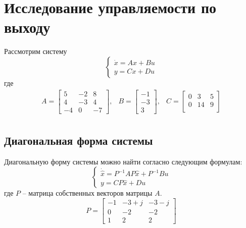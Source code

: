 \section{Исследование управляемости по выходу}
Рассмотрим систему 
\begin{equation}
    \begin{cases}
        \dot{x} = Ax + Bu \\
        y = Cx + Du 
    \end{cases}
\end{equation}
где 
\begin{equation}
    \begin{array}{ccc}
        A = \begin{bmatrix}
            5 & -2 & 8 \\
            4 & -3 & 4 \\
            -4 & 0 & -7
        \end{bmatrix}, &
        B = \begin{bmatrix}
            -1 \\
            -3 \\
            3
        \end{bmatrix}, &
        C = \begin{bmatrix}
            0 & 3 & 5  \\ 
            0 & 14 & 9 \\
        \end{bmatrix} \\
    \end{array}
\end{equation}


\subsection{Диагональная форма системы}
Диагональную форму системы можно найти согласно следующим формулам:
\begin{equation}
    \begin{cases}
        \dot{\hat{x}} = P^{-1}AP\hat{x} + P^{-1}Bu \\ 
        y = CP\hat{x} + Du
    \end{cases} 
\end{equation}
где $P$ -- матрица собственных векторов матрицы $A$.
\begin{equation}
    P = \begin{bmatrix}
        -1 & -3+j & -3-j \\
        0 & -2 & -2 \\
        1 & 2 & 2
    \end{bmatrix}
\end{equation}


